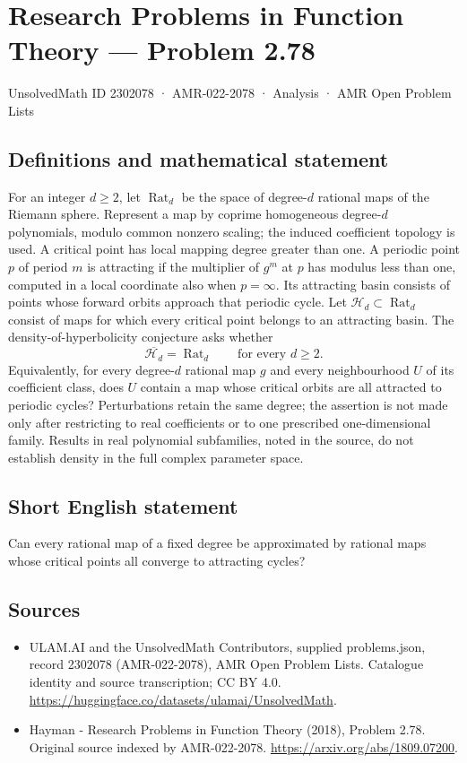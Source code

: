 \documentclass[11pt,a4paper]{article}
\begin{document}
\section*{Research Problems in Function Theory — Problem 2.78}\label{2302078}
{\small UnsolvedMath ID 2302078 · AMR-022-2078 · Analysis · AMR Open Problem Lists}
\subsection{Definitions and mathematical statement}
For an integer $d\ge2$, let $\operatorname{Rat}_d$ be the space of degree-$d$ rational maps of the Riemann sphere. Represent a map by coprime homogeneous degree-$d$ polynomials, modulo common nonzero scaling; the induced coefficient topology is used. A critical point has local mapping degree greater than one.
A periodic point $p$ of period $m$ is attracting if the multiplier of $g^m$ at $p$ has modulus less than one, computed in a local coordinate also when $p=\infty$. Its attracting basin consists of points whose forward orbits approach that periodic cycle.
Let $\mathcal H_d\subset\operatorname{Rat}_d$ consist of maps for which every critical point belongs to an attracting basin. The density-of-hyperbolicity conjecture asks whether
\[
\overline{\mathcal H_d}=\operatorname{Rat}_d
\qquad\text{for every }d\ge2.
\]
Equivalently, for every degree-$d$ rational map $g$ and every neighbourhood $U$ of its coefficient class, does $U$ contain a map whose critical orbits are all attracted to periodic cycles? Perturbations retain the same degree; the assertion is not made only after restricting to real coefficients or to one prescribed one-dimensional family. Results in real polynomial subfamilies, noted in the source, do not establish density in the full complex parameter space.
\subsection{Short English statement}
Can every rational map of a fixed degree be approximated by rational maps whose critical points all converge to attracting cycles?
\subsection{Sources}
\begin{itemize}
\item[S1] ULAM.AI and the UnsolvedMath Contributors, supplied problems.json, record 2302078 (AMR-022-2078), AMR Open Problem Lists. Catalogue identity and source transcription; CC BY 4.0.
\url{https://huggingface.co/datasets/ulamai/UnsolvedMath}.
\item[S2] Hayman - Research Problems in Function Theory (2018), Problem 2.78. Original source indexed by AMR-022-2078.
\url{https://arxiv.org/abs/1809.07200}.
\end{itemize}
\end{document}
